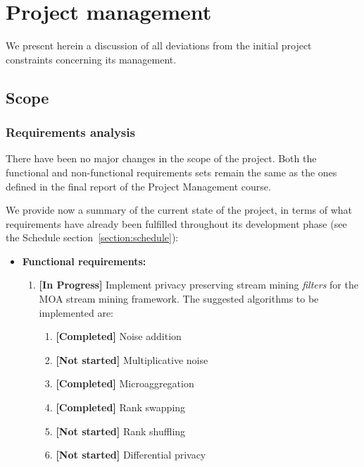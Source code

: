 \section{Project management}
\label{section:project_management}

We present herein a discussion of all deviations from the initial project constraints concerning its management.

\subsection{Scope}
\label{section:scope}

\subsubsection{Requirements analysis}

There have been no major changes in the scope of the project. Both the functional and non-functional requirements sets remain the same as the ones defined in the final report of the Project Management course.

We provide now a summary of the current state of the project, in terms of what requirements have already been fulfilled throughout its development phase (see the Schedule section~\ref{section:schedule}):

\begin{itemize}
	\item \textbf{Functional requirements:} 
	\begin{enumerate}
		\item \textbf{[In Progress]} Implement privacy preserving stream mining \textit{filters} for the MOA stream mining framework. The suggested algorithms to be implemented are:
		\begin{enumerate}
			\item \textbf{[Completed]} Noise addition~\cite[p.~54]{book:StatisticalDisclosureControl}
			\item \textbf{[Not started]} Multiplicative noise~\cite[p.~57]{book:StatisticalDisclosureControl}
			\item \textbf{[Completed]} Microaggregation~\cite[p.~60]{book:StatisticalDisclosureControl}
			\item \textbf{[Completed]} Rank swapping~\cite[p.~72]{book:StatisticalDisclosureControl}
			\item \textbf{[Not started]} Rank shuffling~\cite[p.~73]{book:StatisticalDisclosureControl}
			\item \textbf{[Not started]} Differential privacy~\cite{Dwork06differentialprivacy}
		\end{enumerate}
	\end{enumerate}
\end{itemize}

